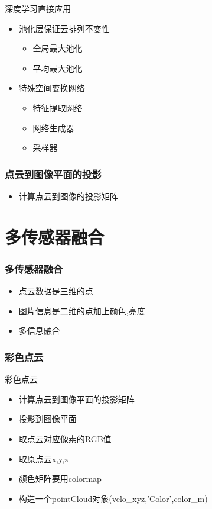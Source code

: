 \documentclass{beamer}
\begin{document}
\begin{frame}
  \begin{block}{深度学习直接应用}
    \begin{itemize}
    \item 池化层保证云排列不变性
      \begin{itemize}
      \item 全局最大池化
      \item 平均最大池化
      \end{itemize}
    \item 特殊空间变换网络
      \begin{itemize}
      \item 特征提取网络
      \item 网络生成器
      \item 采样器
      \end{itemize}
    \end{itemize}

  \end{block}
\end{frame}
\begin{frame}
  \frametitle{点云到图像平面的投影}
  \begin{itemize}
  \item 计算点云到图像的投影矩阵
  \end{itemize}
\end{frame}

\section{多传感器融合}
\begin{frame}
  \frametitle{多传感器融合}
  \begin{itemize}
  \item 点云数据是三维的点
  \item 图片信息是二维的点加上颜色,亮度
  \item 多信息融合
  \end{itemize}
\end{frame}

\begin{frame}
  \frametitle{彩色点云}

  \begin{block}{彩色点云}
    \begin{itemize}
    \item 计算点云到图像平面的投影矩阵
    \item 投影到图像平面
    \item 取点云对应像素的RGB值
    \item 取原点云x,y,z
    \item 颜色矩阵要用colormap
    \item 构造一个pointCloud对象(velo_xyz,'Color',color_m)
    \end{itemize}

  \end{block}
\end{frame}
\end{document}
